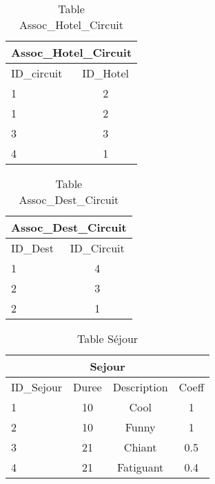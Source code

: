 \documentclass[10pt]{article}
\begin{document}

\begin{table}[h]
\begin{center}
\begin{tabular}{|l|c|}
\hline
\multicolumn{2}{|c|}{Assoc\_Hotel\_Circuit}\\
\hline
ID\_circuit& ID\_Hotel \\
\hline
1 & 2\\
\hline
1 & 2\\
\hline
3 & 3\\
\hline
4 & 1 \\
\hline
\end{tabular}
\end{center}
\caption{Table Assoc\_Hotel\_Circuit}
\end{table}
\newpage


\begin{table}[h]
\begin{center}
\begin{tabular}{|l|c|}
\hline
\multicolumn{2}{|c|}{Assoc\_Dest\_Circuit}\\
\hline
ID\_Dest& ID\_Circuit \\
\hline
1 & 4\\
\hline
2 & 3\\
\hline
2 & 1\\
\hline
\end{tabular}
\end{center}
\caption{Table Assoc\_Dest\_Circuit}
\end{table}


\begin{table}[h]
\begin{center}
\begin{tabular}{|l|c|c|c|}
\hline
\multicolumn{4}{|c|}{Sejour}\\
\hline
ID\_Sejour& Duree & Description& Coeff\\
\hline
1 & 10& Cool & 1\\
\hline
2 & 10& Funny& 1\\
\hline
3 & 21& Chiant& 0.5\\
\hline
4 & 21& Fatiguant& 0.4\\
\hline
\end{tabular}
\end{center}
\caption{Table Séjour}
\end{table}
\end{document}
